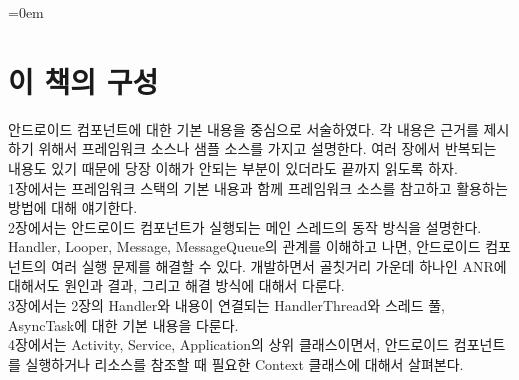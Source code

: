 \documentclass[a4paper,hidelinks,10pt,openany]{book} %
\begin{document}
\parindent=0em


\newpage

\begin{comment}
\begin{abstract}
잘 만든 앱은 다 그럭저럭이지만, 그렇지 않은 앱은 제각각의 이유가 있다. 여기서는 그럭저럭한 앱을 만드는 원리와 방법을 찾아보고, 문제를 발생시키는 제각각의 이유에 대해서도 얘기해보자.
\end{abstract}
\end{comment}

\chapter*{이 책의 구성}
안드로이드 컴포넌트에 대한 기본 내용을 중심으로 서술하였다. 각 내용은 근거를 제시하기 위해서 프레임워크 소스나 샘플 소스를 가지고 설명한다.
여러 장에서 반복되는 내용도 있기 때문에 당장 이해가 안되는 부분이 있더라도 끝까지 읽도록 하자.\\

1장에서는 프레임워크 스택의 기본 내용과 함께 프레임워크 소스를 참고하고 활용하는 방법에 대해 얘기한다.\\

2장에서는 안드로이드 컴포넌트가 실행되는 메인 스레드의 동작 방식을 설명한다.
Handler, Looper, Message, MessageQueue의 관계를 이해하고 나면, 안드로이드 컴포넌트의 여러 실행 문제를 해결할 수 있다. 
개발하면서 골칫거리 가운데 하나인 ANR에 대해서도 원인과 결과, 그리고 해결 방식에 대해서 다룬다.\\

3장에서는 2장의 Handler와 내용이 연결되는 HandlerThread와 스레드 풀, AsyncTask에 대한 기본 내용을 다룬다.\\

4장에서는 Activity, Service, Application의 상위 클래스이면서, 안드로이드 컴포넌트를 실행하거나 리소스를 참조할 때 필요한 Context 클래스에 대해서 살펴본다.\\
\end{document}
